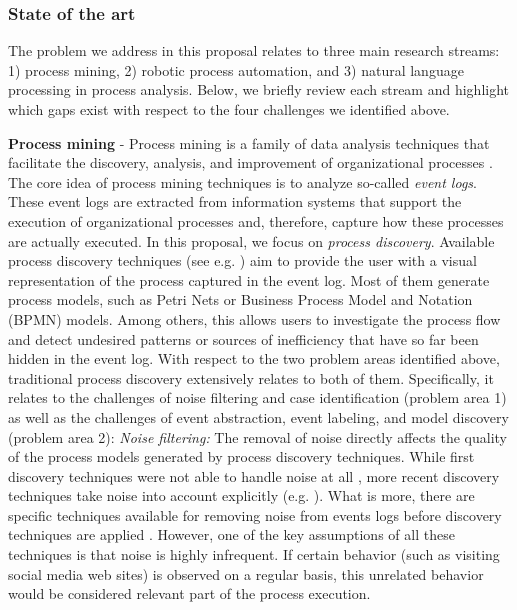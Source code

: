  
\subsubsection{State of the art} 
 \label{sec:stateoftheart}
 
The problem we address in this proposal relates to three main research streams: 1) process mining, 2) robotic process automation, and 3) natural language processing in process analysis. Below, we briefly review each stream and highlight which gaps exist with respect to the four challenges we identified above.  

\textbf{Process mining} - Process mining is a family of data analysis techniques that facilitate the discovery, analysis, and improvement of organizational processes \cite{van2016data}. The core idea of process mining techniques is to analyze so-called \textit{event logs}. These event logs are extracted from information systems that support the execution of organizational processes and, therefore, capture how these processes are actually executed. In this proposal, we focus on \textit{process discovery}. Available process discovery techniques (see e.g. \cite{gunther2007fuzzy,weijters2011flexible,leemans2013discovering}) aim to provide the user with a visual representation of the process captured in the event log. Most of them generate process models, such as Petri Nets or Business Process Model and Notation (BPMN) models. Among others, this allows users to investigate the process flow and detect undesired patterns or sources of inefficiency that have so far been hidden in the event log. With respect to the two problem areas identified above, traditional process discovery extensively relates to both of them. Specifically, it relates to the challenges of noise filtering and case identification (problem area 1) as well as the challenges of event abstraction, event labeling, and model discovery (problem area 2):
\vspace{0.2em}
\newline%
\noindent \textit{Noise filtering:} The removal of noise directly affects the quality of the process models generated by process discovery techniques. While first discovery techniques were not able to handle noise at all \cite{van2004workflow}, more recent discovery techniques take noise into account explicitly (e.g. \cite{weijters2003rediscovering,leemans2013discovering,van2016avoiding}). What is more, there are specific techniques available for removing noise from events logs before discovery techniques are applied \cite{tax2017discovering,CHENG2015138}. However, one of the key assumptions of all these techniques is that noise is highly infrequent. If certain behavior (such as visiting social media web sites) is observed on a regular basis, this unrelated behavior would be considered relevant part of the process execution. 
